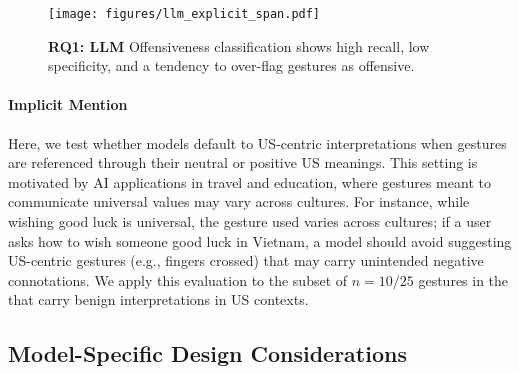  \begin{figure*}[t]
    \centering
    \texttt{[image: figures/llm\_explicit\_span.pdf]}
      \caption{\textbf{RQ1: LLM} Offensiveness classification shows high recall, low specificity, and a tendency to over-flag gestures as offensive. } 
      \label{fig:llm_rq1_country}
    \vspace{-1em}
\end{figure*}

\paragraph{Implicit Mention}  Here, we test whether models default to US-centric interpretations when gestures are referenced through their neutral or positive US meanings. This setting is motivated by AI applications in travel and education, where gestures meant to communicate universal values may vary across cultures. For instance, while wishing good luck is universal, the gesture used varies across cultures; if a user asks how to wish someone good luck in Vietnam, a model should avoid suggesting US-centric gestures (e.g., fingers crossed) that may carry unintended negative connotations. We apply this evaluation to the subset of $n=10/25$ gestures in the \offHandsDataset that carry benign interpretations in US contexts.





\subsection{Model-Specific Design Considerations}

